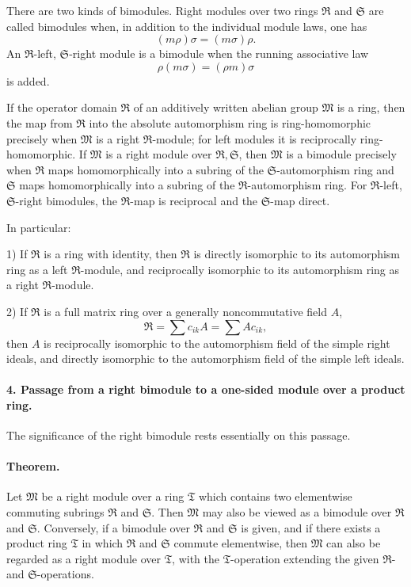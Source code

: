 \documentclass[11pt]{article}
\providecommand{\frR}{\mathfrak R}
\providecommand{\frS}{\mathfrak S}
\providecommand{\frT}{\mathfrak T}
\providecommand{\frM}{\mathfrak M}
\begin{document}
There are two kinds of bimodules. Right modules over two rings \(\frR\) and \(\frS\) are called bimodules when, in addition to the individual module laws, one has
\[
        (m\rho)\sigma=(m\sigma)\rho.
\]
An \(\frR\)-left, \(\frS\)-right module is a bimodule when the running associative law
\[
        \rho(m\sigma)=(\rho m)\sigma
\]
is added.

If the operator domain \(\frR\) of an additively written abelian group \(\frM\) is a ring, then the map from \(\frR\) into the absolute automorphism ring is ring-homomorphic precisely when \(\frM\) is a right \(\frR\)-module; for left modules it is reciprocally ring-homomorphic. If \(\frM\) is a right module over \(\frR,\frS\), then \(\frM\) is a bimodule precisely when \(\frR\) maps homomorphically into a subring of the \(\frS\)-automorphism ring and \(\frS\) maps homomorphically into a subring of the \(\frR\)-automorphism ring. For \(\frR\)-left, \(\frS\)-right bimodules, the \(\frR\)-map is reciprocal and the \(\frS\)-map direct.

In particular:

1) If \(\frR\) is a ring with identity, then \(\frR\) is directly isomorphic to its automorphism ring as a left \(\frR\)-module, and reciprocally isomorphic to its automorphism ring as a right \(\frR\)-module.

2) If \(\frR\) is a full matrix ring over a generally noncommutative field \(A\),
\[
        \frR=\sum c_{ik}A=\sum A c_{ik},
\]
then \(A\) is reciprocally isomorphic to the automorphism field of the simple right ideals, and directly isomorphic to the automorphism field of the simple left ideals.

\paragraph{4. Passage from a right bimodule to a one-sided module over a product ring.}
The significance of the right bimodule rests essentially on this passage.

\paragraph{Theorem.}
Let \(\frM\) be a right module over a ring \(\frT\) which contains two elementwise commuting subrings \(\frR\) and \(\frS\). Then \(\frM\) may also be viewed as a bimodule over \(\frR\) and \(\frS\). Conversely, if a bimodule over \(\frR\) and \(\frS\) is given, and if there exists a product ring \(\frT\) in which \(\frR\) and \(\frS\) commute elementwise, then \(\frM\) can also be regarded as a right module over \(\frT\), with the \(\frT\)-operation extending the given \(\frR\)- and \(\frS\)-operations.
\end{document}
